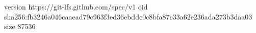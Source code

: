 version https://git-lfs.github.com/spec/v1
oid sha256:fb3246a046caaead79c963f3ed36ebddc0c8bfa87c33a62e236ada273b3daa03
size 87536
